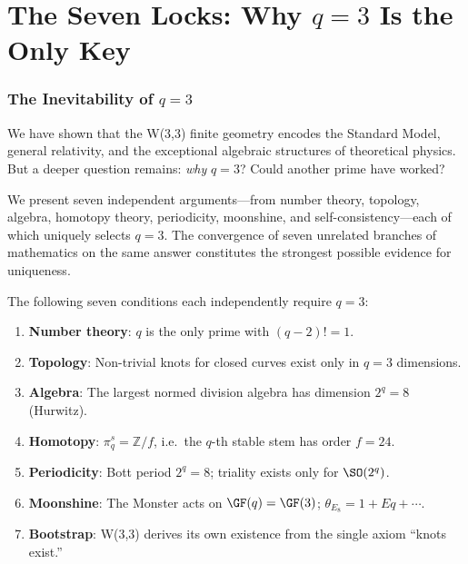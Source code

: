 \clearpage
\part{The Seven Locks: Why $q=3$ Is the Only Key}

\section{The Inevitability of $q=3$}
\label{sec:inevitability}

We have shown that the W(3,3) finite geometry encodes
the Standard Model, general relativity, and the exceptional
algebraic structures of theoretical physics.
But a deeper question remains: \emph{why} $q=3$?
Could another prime have worked?

We present seven independent arguments---from number theory,
topology, algebra, homotopy theory, periodicity, moonshine,
and self-consistency---each of which uniquely selects $q=3$.
The convergence of seven unrelated branches of mathematics
on the same answer constitutes the strongest possible
evidence for uniqueness.

\begin{theorem}
\label{thm:seven-locks}
The following seven conditions each independently require $q=3$:
\begin{enumerate}
\item \textbf{Number theory}: $q$ is the only prime with $(q{-}2)!=1$.
\item \textbf{Topology}: Non-trivial knots for closed curves exist only in $q=3$ dimensions.
\item \textbf{Algebra}: The largest normed division algebra has dimension $2^q=8$ (Hurwitz).
\item \textbf{Homotopy}: $\pi_q^s = \mathbb{Z}/f$, i.e.\ the $q$-th stable stem has order $f=24$.
\item \textbf{Periodicity}: Bott period $2^q=8$; triality exists only for $\SO(2^q)$.
\item \textbf{Moonshine}: The Monster acts on $\GF(q)=\GF(3)$; $\theta_{E_8}=1+Eq+\cdots$.
\item \textbf{Bootstrap}: W(3,3) derives its own existence from the single axiom ``knots exist.''
\end{enumerate}
\end{theorem}



